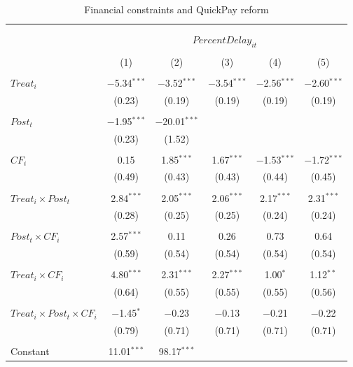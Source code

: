 \documentclass[
]{article}
\begin{document}
\begin{table}[H] \centering 
  \caption{Financial constraints and QuickPay reform} 
  \label{} 
\small 
\begin{tabular}{@{\extracolsep{-2pt}}lccccc} 
\\[-1.8ex]\hline 
\hline \\[-1.8ex] 
\\[-1.8ex] & \multicolumn{5}{c}{$PercentDelay_{it}$  } \\ 
\\[-1.8ex] & (1) & (2) & (3) & (4) & (5)\\ 
\hline \\[-1.8ex] 
 $Treat_i$ & $-$5.34$^{***}$ & $-$3.52$^{***}$ & $-$3.54$^{***}$ & $-$2.56$^{***}$ & $-$2.60$^{***}$ \\ 
  & (0.23) & (0.19) & (0.19) & (0.19) & (0.19) \\ 
  & & & & & \\ 
 $Post_t$ & $-$1.95$^{***}$ & $-$20.01$^{***}$ &  &  &  \\ 
  & (0.23) & (1.52) &  &  &  \\ 
  & & & & & \\ 
 $CF_i$ & 0.15 & 1.85$^{***}$ & 1.67$^{***}$ & $-$1.53$^{***}$ & $-$1.72$^{***}$ \\ 
  & (0.49) & (0.43) & (0.43) & (0.44) & (0.45) \\ 
  & & & & & \\ 
 $Treat_i \times Post_t$ & 2.84$^{***}$ & 2.05$^{***}$ & 2.06$^{***}$ & 2.17$^{***}$ & 2.31$^{***}$ \\ 
  & (0.28) & (0.25) & (0.25) & (0.24) & (0.24) \\ 
  & & & & & \\ 
 $Post_t \times CF_i$ & 2.57$^{***}$ & 0.11 & 0.26 & 0.73 & 0.64 \\ 
  & (0.59) & (0.54) & (0.54) & (0.54) & (0.54) \\ 
  & & & & & \\ 
 $Treat_i \times CF_i$ & 4.80$^{***}$ & 2.31$^{***}$ & 2.27$^{***}$ & 1.00$^{*}$ & 1.12$^{**}$ \\ 
  & (0.64) & (0.55) & (0.55) & (0.55) & (0.56) \\ 
  & & & & & \\ 
 $Treat_i \times Post_t \times CF_i$ & $-$1.45$^{*}$ & $-$0.23 & $-$0.13 & $-$0.21 & $-$0.22 \\ 
  & (0.79) & (0.71) & (0.71) & (0.71) & (0.71) \\ 
  & & & & & \\ 
 Constant & 11.01$^{***}$ & 98.17$^{***}$ &  &  &  \\ 

\end{tabular}
\end{table}
\end{document}
